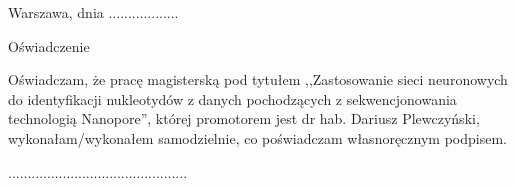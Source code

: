 \documentclass[a4paper,11pt,twoside]{report}
\theoremstyle{definition}
\newcommand{\tytul}{Zastosowanie sieci neuronowych do identyfikacji nukleotydów z danych pochodzących z sekwencjonowania technologią Nanopore}
\renewcommand{\title}{Application of neural networks to identify nucleotides from data derived from Nanopore sequencing}
\newcommand{\type}{magisters} %
\newcommand{\supervisor}{dr hab. Dariusz Plewczyński}
\begin{document}
{
\begin{abstract}

\begin{center}
\title
\end{center}

DNA sequencing by translocation of DNA strand through a nanopore offers lower cost and produces long reads. The process of translation of electric signal to sequence of nucloetides, called basecalling, strongly influences the quality of the result of sequencing. In this work a tool for basecalling is presented.

A deep learning based solution is presented. Several neural network architectures were tested, including fully convolutional ones and ones using recurrent layers. Best one produces reads with identity rate up to 91.15\% and assembly identity rate up to 99.77\%. Results are analyzed to discover features of segments of input electrical signal  that cause errors.  \\

\noindent \textbf{Keywords:} DNA sequencing, deep learning, sequence modelling, nanopore sequencing, neural networks
\end{abstract}
}




\null\thispagestyle{empty}\newpage

\null \hfill Warszawa, dnia ..................\\

\par\vspace{5cm}

\begin{center}
Oświadczenie
\end{center}

\indent Oświadczam, że pracę \type ką pod
tytułem ,,\tytul '', której promotorem jest \supervisor , wykonałam/wykonałem
samodzielnie, co poświadczam własnoręcznym podpisem.
\vspace{2cm}


\begin{flushright}
  \begin{minipage}{50mm}
    \begin{center}
      ..............................................

    \end{center}
  \end{minipage}
\end{flushright}
\end{document}
